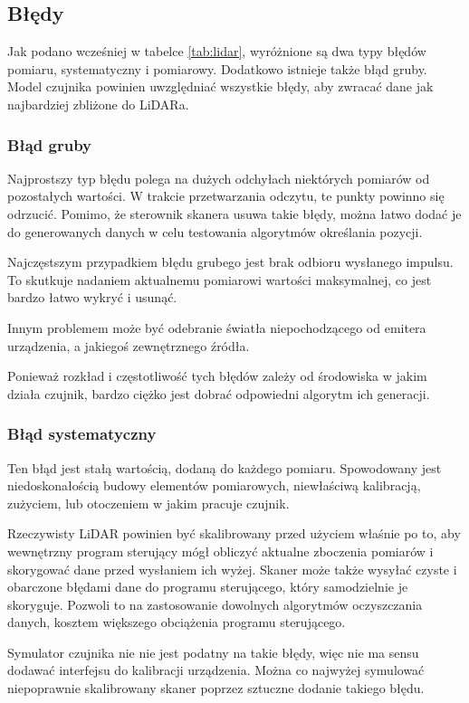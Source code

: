 	\subsection{Błędy}
		Jak podano wcześniej w tabelce \ref{tab:lidar}, wyróżnione są dwa typy błędów pomiaru, systematyczny i pomiarowy.
		Dodatkowo istnieje także błąd gruby.
		Model czujnika powinien uwzględniać wszystkie błędy, aby zwracać dane jak najbardziej zbliżone do LiDARa.

		\subsubsection{Błąd gruby}
			Najprostszy typ błędu polega na dużych odchyłach niektórych pomiarów od pozostałych wartości.
			W trakcie przetwarzania odczytu, te punkty powinno się odrzucić.
			Pomimo, że sterownik skanera usuwa takie błędy, można łatwo dodać je do generowanych danych w celu testowania algorytmów określania pozycji.

			Najczęstszym przypadkiem błędu grubego jest brak odbioru wysłanego impulsu. 
			To skutkuje nadaniem aktualnemu pomiarowi wartości maksymalnej, co jest bardzo łatwo wykryć i usunąć.

			Innym problemem może być odebranie światła niepochodzącego od emitera urządzenia, a jakiegoś zewnętrznego źródła.

			Ponieważ rozkład i częstotliwość tych błędów zależy od środowiska w jakim działa czujnik, bardzo ciężko jest dobrać odpowiedni algorytm ich generacji.

		\subsubsection{Błąd systematyczny}
			Ten błąd jest stałą wartością, dodaną do każdego pomiaru.
			Spowodowany jest niedoskonałością budowy elementów pomiarowych, niewłaściwą kalibracją, zużyciem, lub otoczeniem w jakim pracuje czujnik.

			Rzeczywisty LiDAR powinien być skalibrowany przed użyciem właśnie po to, aby wewnętrzny program sterujący mógł obliczyć aktualne zboczenia pomiarów
			i skorygować dane przed wysłaniem ich wyżej.
			Skaner może także wysyłać czyste i obarczone błędami dane do programu sterującego, który samodzielnie je skoryguje.
			Pozwoli to na zastosowanie dowolnych algorytmów oczyszczania danych, kosztem większego obciążenia programu sterującego.

			Symulator czujnika nie nie jest podatny na takie błędy, więc nie ma sensu dodawać interfejsu do kalibracji urządzenia.
			Można co najwyżej symulować niepoprawnie skalibrowany skaner poprzez sztuczne dodanie takiego błędu.

